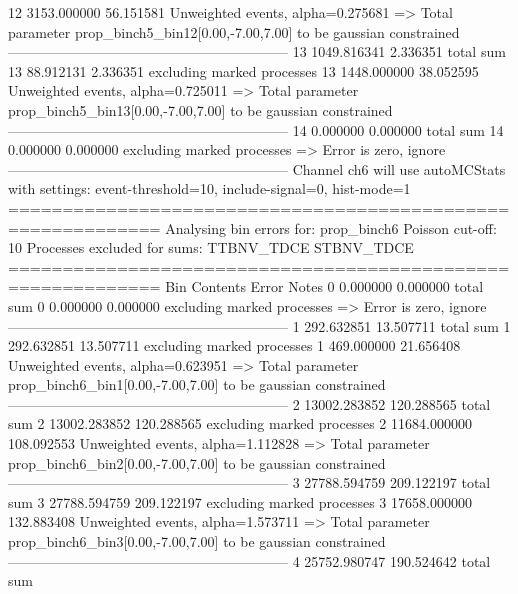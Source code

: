 12         3153.000000     56.151581       Unweighted events, alpha=0.275681
  => Total parameter prop_binch5_bin12[0.00,-7.00,7.00] to be gaussian constrained
------------------------------------------------------------
13         1049.816341     2.336351        total sum                     
13         88.912131       2.336351        excluding marked processes    
13         1448.000000     38.052595       Unweighted events, alpha=0.725011
  => Total parameter prop_binch5_bin13[0.00,-7.00,7.00] to be gaussian constrained
------------------------------------------------------------
14         0.000000        0.000000        total sum                     
14         0.000000        0.000000        excluding marked processes    
  => Error is zero, ignore      
------------------------------------------------------------
Channel ch6 will use autoMCStats with settings: event-threshold=10, include-signal=0, hist-mode=1
============================================================
Analysing bin errors for: prop_binch6
Poisson cut-off: 10
Processes excluded for sums: TTBNV_TDCE STBNV_TDCE
============================================================
Bin        Contents        Error           Notes                         
0          0.000000        0.000000        total sum                     
0          0.000000        0.000000        excluding marked processes    
  => Error is zero, ignore      
------------------------------------------------------------
1          292.632851      13.507711       total sum                     
1          292.632851      13.507711       excluding marked processes    
1          469.000000      21.656408       Unweighted events, alpha=0.623951
  => Total parameter prop_binch6_bin1[0.00,-7.00,7.00] to be gaussian constrained
------------------------------------------------------------
2          13002.283852    120.288565      total sum                     
2          13002.283852    120.288565      excluding marked processes    
2          11684.000000    108.092553      Unweighted events, alpha=1.112828
  => Total parameter prop_binch6_bin2[0.00,-7.00,7.00] to be gaussian constrained
------------------------------------------------------------
3          27788.594759    209.122197      total sum                     
3          27788.594759    209.122197      excluding marked processes    
3          17658.000000    132.883408      Unweighted events, alpha=1.573711
  => Total parameter prop_binch6_bin3[0.00,-7.00,7.00] to be gaussian constrained
------------------------------------------------------------
4          25752.980747    190.524642      total sum                     
